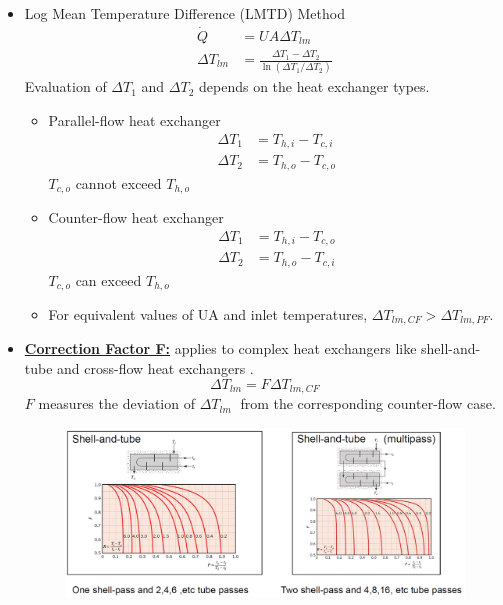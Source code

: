 \begin{itemize}
    \item Log Mean Temperature Difference (\color{blue}LMTD\color{black}) Method 
    \begin{align*}
        \dot{Q} &= UA\Delta T_{lm} \\
        \Delta T_{lm} &= \frac{\Delta T_1 - \Delta T_2}{\ln(\Delta T_1 / \Delta T_2)}
    \end{align*}
    \color{red} Evaluation of $\Delta T_1$ and $\Delta T_2$ depends on the heat exchanger types.\color{black}
    \begin{itemize}
        \item Parallel-flow heat exchanger
        \begin{align*}
            \Delta T_1 &= T_{h,i} - T_{c,i} \\
            \Delta T_2 &= T_{h,o} - T_{c,o}
        \end{align*}
        \color{blue} $T_{c,o}$ cannot exceed $T_{h,o}$\color{black}
        \item Counter-flow heat exchanger
        \begin{align*}
            \Delta T_1 &= T_{h,i} - T_{c,o} \\
            \Delta T_2 &= T_{h,o} - T_{c,i}
        \end{align*}
         \color{blue} $T_{c,o}$ can exceed $T_{h,o}$\color{black}
         \item For \color{blue} equivalent values of UA \color{black} and inlet temperatures, \color{blue} $\Delta T_{lm,CF}> \Delta T_{lm,PF}$.
    \end{itemize}
    \item \underline{\textbf{Correction Factor F:}} applies to complex heat exchangers like \color{blue}shell-and-tube \color{black} and \color{blue} cross-flow heat exchangers \color{black}.
    \begin{equation*}
        \Delta T_{lm} = F \Delta T_{lm,CF}
    \end{equation*}
    $F$ measures the \color{red} deviation of $\Delta T_{lm}\;$\color{black} from the corresponding \color{red} counter-flow \color{black} case. 
    \begin{figure}[H]
        \centering
        \includegraphics[width=1.0\linewidth]{images/heat_exchanger_correction_factor_1.png}

\end{figure}
\end{itemize}
